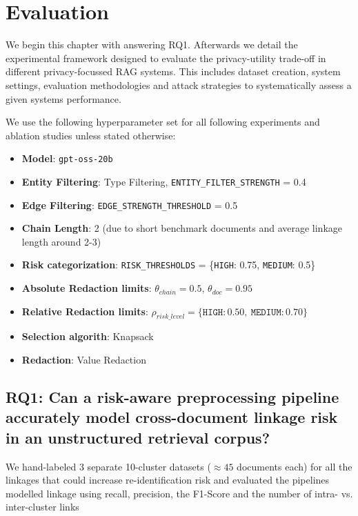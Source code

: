\section{Evaluation}\label{sec:evaluation}
We begin this chapter with answering RQ1. Afterwards we detail the experimental framework designed to evaluate the privacy-utility trade-off in different privacy-focussed {RAG} systems. This includes dataset creation, system settings, evaluation methodologies and attack strategies to systematically assess a given systems performance.

We use the following hyperparameter set for all following experiments and ablation studies unless stated otherwise:
\begin{tcolorbox}[title={sAnon Configuration}, label={evaluation-subsec:sanon-config}]
  \small
  \begin{itemize}
    \item \textbf{Model}: \texttt{gpt-oss-20b}
    \item \textbf{Entity Filtering}: Type Filtering, \texttt{ENTITY\_FILTER\_STRENGTH} = 0.4
    \item \textbf{Edge Filtering}: \texttt{EDGE\_STRENGTH\_THRESHOLD} = 0.5
    \item \textbf{Chain Length}: 2 (due to short benchmark documents and average linkage length around 2-3)
    \item \textbf{Risk categorization}: \texttt{RISK\_THRESHOLDS} = \{\texttt{HIGH}: 0.75, \texttt{MEDIUM}: 0.5\}
    \item \textbf{Absolute Redaction limits}: $\theta_{chain} = 0.5$, $\theta_{doc} = 0.95$ 
    \item \textbf{Relative Redaction limits}: $\rho_{risk\_level} = \{\texttt{HIGH}:0.50,\ \texttt{MEDIUM}:0.70\}$
    \item \textbf{Selection algorith}: Knapsack
    \item \textbf{Redaction}: Value Redaction
\end{itemize}
\end{tcolorbox}




\subsection{RQ1: Can a risk-aware preprocessing pipeline accurately model cross-document linkage risk in an unstructured retrieval corpus?} %
We hand-labeled 3 separate 10-cluster datasets ($\approx 45$ documents each) for all the linkages that could increase re-identification risk and evaluated the pipelines modelled linkage using recall, precision, the F1-Score and the number of intra- vs. inter-cluster links

